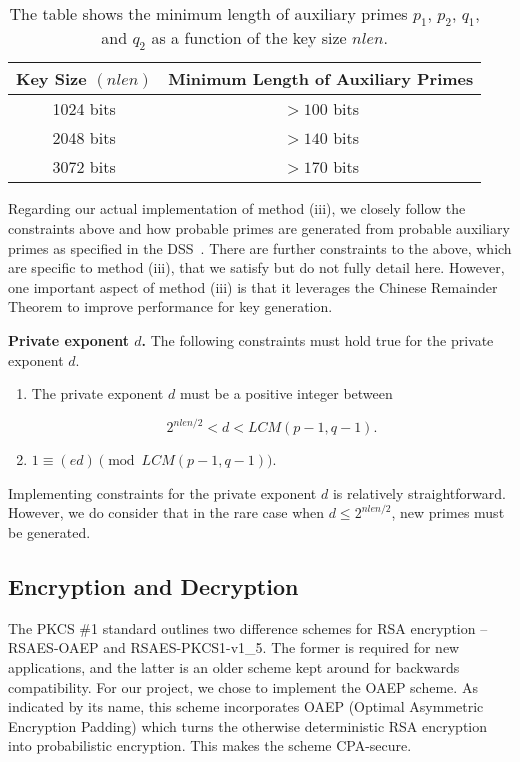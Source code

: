 \documentclass[a4paper]{article}
\begin{document}
\begin{table}[h]
\centering
\begin{tabular}{|c|c|} 
 \hline
 Key Size $(nlen)$ & Minimum Length of Auxiliary Primes\\ \hline
 1024 bits & $> 100$ bits \\ 
 2048 bits & $> 140$ bits \\ 
 3072 bits & $> 170$ bits \\
 \hline
\end{tabular}
\caption{The table shows the minimum length of auxiliary primes $p_1$, $p_2$, $q_1$, and $q_2$ as a function of the key size $nlen$.}
\label{tab:aux_len}
\end{table}

Regarding our actual implementation of method (iii), we closely follow the constraints above and how probable primes are generated from probable auxiliary primes as specified in the DSS~\cite{fips2013186}. There are further constraints to the above, which are specific to method (iii), that we satisfy but do not fully detail here. However, one important aspect of method (iii) is that it leverages the Chinese Remainder Theorem to improve performance for key generation.\newline

\noindent \textbf{Private exponent $d$.} The following constraints must hold true for the private exponent $d$.

\begin{enumerate}
    \item The private exponent $d$ must be a positive integer between

        \begin{equation}
            2^{nlen/2} < d < LCM(p-1,q-1).
        \end{equation}

    \item $1 \equiv (ed) \pmod{LCM(p-1,q-1)}$.
\end{enumerate}

Implementing constraints for the private exponent $d$ is relatively straightforward. However, we do consider that in the rare case when $d \leq 2^{nlen/2}$, new primes must be generated.

\subsection{Encryption and Decryption}

The PKCS {\#1} standard outlines two difference schemes for RSA encryption – RSAES-OAEP and RSAES-PKCS1-v1\_5. The former is required for new applications, and the latter is an older scheme kept around for backwards compatibility. For our project, we chose to implement the OAEP scheme. As indicated by its name, this scheme incorporates OAEP (Optimal Asymmetric Encryption Padding) which turns the otherwise deterministic RSA encryption into probabilistic encryption. This makes the scheme CPA-secure.
\end{document}
